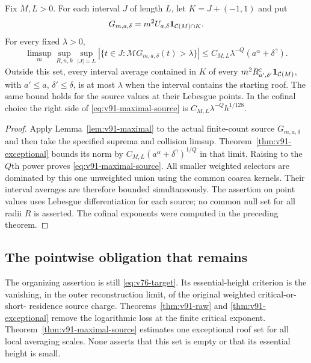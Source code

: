 \begin{theorem}
\label{thm:v91-maximal-source}
Fix $M,L>0$. For each interval $J$ of length $L$, let
$K=J+(-1,1)$ and put
\[
 G_{m,a,\delta}=m^2U_{a,\delta}
                          \mathbf1_{\mathcal C(M)\cap K}.
\]
For every fixed $\lambda>0$,
\begin{equation}\label{eq:v91-maximal-source}
 \limsup_m\sup_{R,n,k}\sup_{|J|=L}
 |\{t\in J:\mathcal M G_{m,a,\delta}(t)>\lambda\}|
                  \le C_{M,L}\lambda^{-Q}
                                      (a^\alpha+\delta^\gamma).
\end{equation}
Outside this set, every interval average contained in $K$ of every
$m^2R_{a',\delta'}^\varepsilon\mathbf1_{\mathcal C(M)}$, with
$a'\le a$, $\delta'\le\delta$, is at most $\lambda$ when the
interval contains the starting roof. The same bound holds for the
source values at their Lebesgue points. In the cofinal choice the
right side of \eqref{eq:v91-maximal-source} is
$C_{M,L}\lambda^{-Q}h^{1/128}$.
\end{theorem}
\begin{proof}
Apply Lemma~\ref{lem:v91-maximal} to the actual finite-count source
$G_{m,a,\delta}$ and then take the specified suprema and collision
limsup. Theorem~\ref{thm:v91-exceptional} bounds its norm by
$C_{M,L}(a^\alpha+\delta^\gamma)^{1/Q}$ in that limit.
Raising to the $Q$th power proves \eqref{eq:v91-maximal-source}.
All smaller weighted selectors are dominated by this one unweighted
union using the common coarea kernels. Their interval averages are
therefore bounded simultaneously. The assertion on point values
uses Lebesgue differentiation for each source; no common null set
for all radii $R$ is asserted. The cofinal exponents were computed
in the preceding theorem.
\end{proof}

\subsection{The pointwise obligation that remains}
The organizing assertion is still \eqref{eq:v76-target}. Its
essential-height criterion is the vanishing, in the outer
reconstruction limit, of the original weighted critical-or-short-
residence source charge. Theorems~\ref{thm:v91-raw} and
\ref{thm:v91-exceptional} remove the logarithmic loss at the finite
critical exponent. Theorem~\ref{thm:v91-maximal-source} estimates
one exceptional roof set for all local averaging scales. None
asserts that this set is empty or that its essential height is small.

